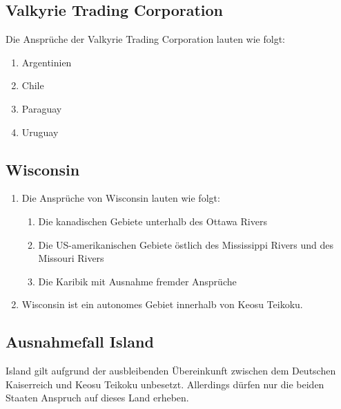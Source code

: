 \documentclass{article}
\begin{document}
\subsection{Valkyrie Trading Corporation}
Die Ansprüche der Valkyrie Trading Corporation lauten wie folgt:
\begin{enumerate}
    \item Argentinien
    \item Chile
    \item Paraguay
    \item Uruguay
\end{enumerate}

\subsection{Wisconsin}
\begin{enumerate}[(1)]
    \item Die Ansprüche von Wisconsin lauten wie folgt:
    \begin{enumerate}[1.]
        \item Die kanadischen Gebiete unterhalb des Ottawa Rivers
        \item Die US-amerikanischen Gebiete östlich des Mississippi Rivers und des Missouri Rivers
        \item Die Karibik mit Ausnahme fremder Ansprüche
    \end{enumerate}
    \item Wisconsin ist ein autonomes Gebiet innerhalb von Keosu Teikoku.
\end{enumerate}

\subsection{Ausnahmefall Island}
Island gilt aufgrund der ausbleibenden Übereinkunft zwischen dem Deutschen Kaiserreich und Keosu Teikoku unbesetzt. Allerdings dürfen nur die beiden
Staaten Anspruch auf dieses Land erheben.
\end{document}
